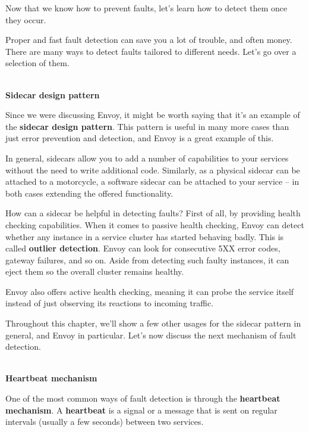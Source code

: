 Now that we know how to prevent faults, let's learn how to detect them once they occur.


Proper and fast fault detection can save you a lot of trouble, and often money. There are many ways to detect faults tailored to different needs. Let's go over a selection of them.


\hspace*{\fill} \\ %
\noindent
\textbf{Sidecar design pattern}

Since we were discussing Envoy, it might be worth saying that it's an example of the \textbf{sidecar design pattern}. This pattern is useful in many more cases than just error prevention and detection, and Envoy is a great example of this.

In general, sidecars allow you to add a number of capabilities to your services without the need to write additional code. Similarly, as a physical sidecar can be attached to a motorcycle, a software sidecar can be attached to your service – in both cases extending the offered functionality.

How can a sidecar be helpful in detecting faults? First of all, by providing health checking capabilities. When it comes to passive health checking, Envoy can detect whether any instance in a service cluster has started behaving badly. This is called \textbf{outlier detection}. Envoy can look for consecutive 5XX error codes, gateway failures, and so on. Aside from detecting such faulty instances, it can eject them so the overall cluster remains healthy.

Envoy also offers active health checking, meaning it can probe the service itself instead of just observing its reactions to incoming traffic.

Throughout this chapter, we'll show a few other usages for the sidecar pattern in general, and Envoy in particular. Let's now discuss the next mechanism of fault detection.


\hspace*{\fill} \\ %
\noindent
\textbf{Heartbeat mechanism}

One of the most common ways of fault detection is through the \textbf{heartbeat mechanism}. A \textbf{heartbeat} is a signal or a message that is sent on regular intervals (usually a few seconds) between two services.

